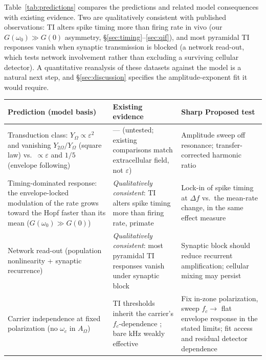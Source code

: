 \documentclass[11pt,a4paper]{article}
\providecommand{\DIFaddtex}[1]{{\protect\color{blue} \sf #1}} %
\providecommand{\DIFdeltex}[1]{{\protect\color{red} \scriptsize #1}} %
\providecommand{\DIFaddFL}[1]{\DIFadd{#1}} %
\providecommand{\DIFdelFL}[1]{\DIFdel{#1}} %
\providecommand{\DIFaddbeginFL}{} %
\providecommand{\DIFaddendFL}{} %
\providecommand{\DIFdelbeginFL}{} %
\providecommand{\DIFdelendFL}{} %
\providecommand{\DIFadd}[1]{\texorpdfstring{\DIFaddtex{#1}}{#1}} %
\providecommand{\DIFdel}[1]{\texorpdfstring{\DIFdeltex{#1}}{}} %
\begin{document}
Table~\ref{tab:predictions} compares the predictions and related model consequences
with existing evidence.
Two are qualitatively consistent with published observations: TI alters spike timing
more than firing rate in vivo \cite{vieira2024} (our $G(\omega_0)\!\gg\!G(0)$ asymmetry,
\S\ref{sec:timing}--\ref{sec:qif}), and most pyramidal TI responses vanish when synaptic
transmission is blocked \cite{caldas2024} (a network read-out, which tests network
involvement rather than excluding a surviving cellular detector). A
quantitative reanalysis of these datasets against the model is a natural next step, and
\S\ref{sec:discussion} specifies the amplitude-exponent fit it would require.

\begin{table}[h]
\centering\small
\renewcommand{\arraystretch}{1.25}
\begin{tabular}{@{}>{\raggedright\arraybackslash}p{} >{\raggedright\arraybackslash}p{} >{\raggedright\arraybackslash}p{}@{}}
\toprule
\textbf{Prediction (model basis)} & \textbf{Existing evidence} & \textbf{\DIFdelbeginFL \DIFdelFL{Sharp }\DIFdelendFL \DIFaddbeginFL \DIFaddFL{Proposed }\DIFaddendFL test} \\
\midrule
Transduction class: $Y_\Omega\propto\varepsilon^2$ and vanishing $Y_{2\Omega}/Y_\Omega$
(square law) vs.\ $\propto\varepsilon$ and $1/5$ (envelope following) & --- (untested;
existing comparisons match extracellular field, not $\varepsilon$) & Amplitude sweep off
resonance; transfer-corrected harmonic ratio \\
Timing-dominated response: the envelope-locked modulation of the rate grows toward
the Hopf faster than its mean ($G(\omega_0)\!\gg\!G(0)$) & \emph{Qualitatively
consistent}: TI alters spike timing more than firing rate, primate \cite{vieira2024} &
Lock-in of spike timing at $\Delta f$ vs.\ the mean-rate change, in the same effect
measure \\
Network read-out (population nonlinearity + synaptic recurrence) &
\emph{Qualitatively consistent}: most pyramidal TI responses vanish under synaptic block
\cite{caldas2024} & Synaptic block should reduce recurrent amplification; cellular
mixing may persist \\
Carrier independence at fixed polarization (no $\omega_c$ in $A_\Omega$) & TI thresholds
inherit the carrier's $f_c$-dependence \cite{opancar2025,peripheral2023}; bare kHz weakly
effective \cite{esmaeilpour2020} & Fix in-zone polarization, sweep $f_c\!\to$ flat envelope
response in the stated limits; fit access and residual detector dependence \\

\end{tabular}
\end{table}
\end{document}
